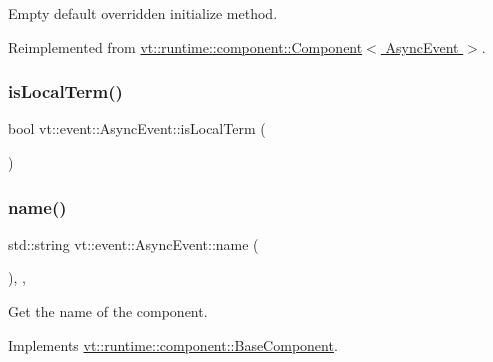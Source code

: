 Empty default overridden initialize method. 



Reimplemented from \hyperlink{structvt_1_1runtime_1_1component_1_1_component_a7f07384d294e59796add9ce6be2d6410}{vt\+::runtime\+::component\+::\+Component$<$ Async\+Event $>$}.

\mbox{\label{structvt_1_1event_1_1_async_event_a10af2d5cb5318e2ef25eabcd88c8139a}} 
\subsubsection{\texorpdfstring{is\+Local\+Term()}{isLocalTerm()}}
{\footnotesize\ttfamily bool vt\+::event\+::\+Async\+Event\+::is\+Local\+Term (\begin{DoxyParamCaption}{ }\end{DoxyParamCaption})}

\mbox{\label{structvt_1_1event_1_1_async_event_ac68b97804ca9b3dab1785a3c8a5d8242}} 
\subsubsection{\texorpdfstring{name()}{name()}}
{\footnotesize\ttfamily std\+::string vt\+::event\+::\+Async\+Event\+::name (\begin{DoxyParamCaption}{ }\end{DoxyParamCaption})\hspace{0.3cm}{\ttfamily [inline]}, {\ttfamily [override]}, {\ttfamily [virtual]}}



Get the name of the component. 



Implements \hyperlink{structvt_1_1runtime_1_1component_1_1_base_component_a7701485f3539f78d42e6bad47fc7eb78}{vt\+::runtime\+::component\+::\+Base\+Component}.

\mbox{\label{structvt_1_1event_1_1_async_event_a4d6056e47909a858fcd3bfc3782b8d2d}} 

